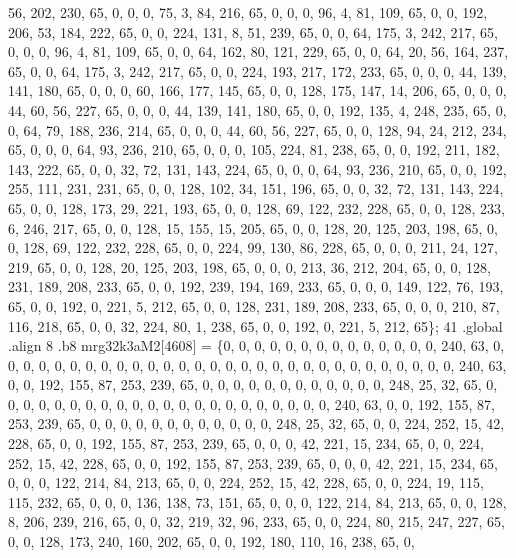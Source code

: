 \begin{DoxyCode}
       56, 202, 230, 65, 0, 0, 0, 75, 3, 84, 216, 65, 0, 0, 0, 96, 4, 81, 109, 65, 0, 0, 192, 206, 53, 184, 222, 65,
       0, 0, 224, 131, 8, 51, 239, 65, 0, 0, 64, 175, 3, 242, 217, 65, 0, 0, 0, 96, 4, 81, 109, 65, 0, 0, 64, 162,
       80, 121, 229, 65, 0, 0, 64, 20, 56, 164, 237, 65, 0, 0, 64, 175, 3, 242, 217, 65, 0, 0, 224, 193, 217, 172,
       233, 65, 0, 0, 0, 44, 139, 141, 180, 65, 0, 0, 0, 60, 166, 177, 145, 65, 0, 0, 128, 175, 147, 14, 206, 65,
       0, 0, 0, 44, 60, 56, 227, 65, 0, 0, 0, 44, 139, 141, 180, 65, 0, 0, 192, 135, 4, 248, 235, 65, 0, 0, 64, 79,
       188, 236, 214, 65, 0, 0, 0, 44, 60, 56, 227, 65, 0, 0, 128, 94, 24, 212, 234, 65, 0, 0, 0, 64, 93, 236, 210,
       65, 0, 0, 0, 105, 224, 81, 238, 65, 0, 0, 192, 211, 182, 143, 222, 65, 0, 0, 32, 72, 131, 143, 224, 65, 0,
       0, 0, 64, 93, 236, 210, 65, 0, 0, 192, 255, 111, 231, 231, 65, 0, 0, 128, 102, 34, 151, 196, 65, 0, 0, 32,
       72, 131, 143, 224, 65, 0, 0, 128, 173, 29, 221, 193, 65, 0, 0, 128, 69, 122, 232, 228, 65, 0, 0, 128, 233, 6,
       246, 217, 65, 0, 0, 128, 15, 155, 15, 205, 65, 0, 0, 128, 20, 125, 203, 198, 65, 0, 0, 128, 69, 122, 232,
       228, 65, 0, 0, 224, 99, 130, 86, 228, 65, 0, 0, 0, 211, 24, 127, 219, 65, 0, 0, 128, 20, 125, 203, 198, 65,
       0, 0, 0, 213, 36, 212, 204, 65, 0, 0, 128, 231, 189, 208, 233, 65, 0, 0, 192, 239, 194, 169, 233, 65, 0, 0,
       0, 149, 122, 76, 193, 65, 0, 0, 192, 0, 221, 5, 212, 65, 0, 0, 128, 231, 189, 208, 233, 65, 0, 0, 0, 210, 87,
       116, 218, 65, 0, 0, 32, 224, 80, 1, 238, 65, 0, 0, 192, 0, 221, 5, 212, 65\};
41 .global .align 8 .b8 mrg32k3aM2[4608] = \{0, 0, 0, 0, 0, 0, 0, 0, 0, 0, 0, 0, 0, 0, 240, 63, 0, 0, 0, 0, 0,
       0, 0, 0, 0, 0, 0, 0, 0, 0, 0, 0, 0, 0, 0, 0, 0, 0, 0, 0, 0, 0, 0, 0, 0, 0, 240, 63, 0, 0, 192, 155, 87, 253,
       239, 65, 0, 0, 0, 0, 0, 0, 0, 0, 0, 0, 0, 0, 248, 25, 32, 65, 0, 0, 0, 0, 0, 0, 0, 0, 0, 0, 0, 0, 0, 0, 0,
       0, 0, 0, 0, 0, 0, 0, 240, 63, 0, 0, 192, 155, 87, 253, 239, 65, 0, 0, 0, 0, 0, 0, 0, 0, 0, 0, 0, 0, 248, 25,
       32, 65, 0, 0, 224, 252, 15, 42, 228, 65, 0, 0, 192, 155, 87, 253, 239, 65, 0, 0, 0, 42, 221, 15, 234, 65,
       0, 0, 224, 252, 15, 42, 228, 65, 0, 0, 192, 155, 87, 253, 239, 65, 0, 0, 0, 42, 221, 15, 234, 65, 0, 0, 0,
       122, 214, 84, 213, 65, 0, 0, 224, 252, 15, 42, 228, 65, 0, 0, 224, 19, 115, 115, 232, 65, 0, 0, 0, 136, 138,
       73, 151, 65, 0, 0, 0, 122, 214, 84, 213, 65, 0, 0, 128, 8, 206, 239, 216, 65, 0, 0, 32, 219, 32, 96, 233, 65,
       0, 0, 224, 80, 215, 247, 227, 65, 0, 0, 128, 173, 240, 160, 202, 65, 0, 0, 192, 180, 110, 16, 238, 65, 0,

\end{DoxyCode}
